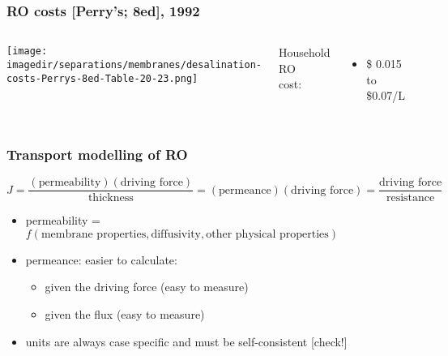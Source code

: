 \begin{frame}\frametitle{RO costs [Perry's; 8ed], 1992}
	\begin{columns}[t]
			\begin{center}
				\texttt{[image: \\imagedir/separations/membranes/desalination-costs-Perrys-8ed-Table-20-23.png]}
			\end{center}
			Household RO\\
			cost:
			\begin{itemize}
				\item	\$ 0.015 to \$0.07/L %
			\end{itemize}
	\end{columns}
\end{frame}

\begin{frame}\frametitle{Transport modelling of RO}
	{\color{myOrange}{Symbolically:}}
	{ \small
	\[
		J = \frac{(\text{permeability})(\text{driving force})}{\text{thickness}} = \displaystyle (\text{permeance})(\text{driving force}) = \dfrac{\text{driving force}}{\text{resistance}}
	\]
	}
	\begin{itemize}
		\item	permeability = $f(\text{membrane properties}, \text{diffusivity}, \text{other physical properties})$
		\item	permeance: easier to calculate:
		\begin{itemize}
			\item	given the driving force (easy to measure)
			\item	given the flux (easy to measure)
		\end{itemize}
		\item	units are always case specific and must be self-consistent [check!]
	\end{itemize}
\end{frame}

